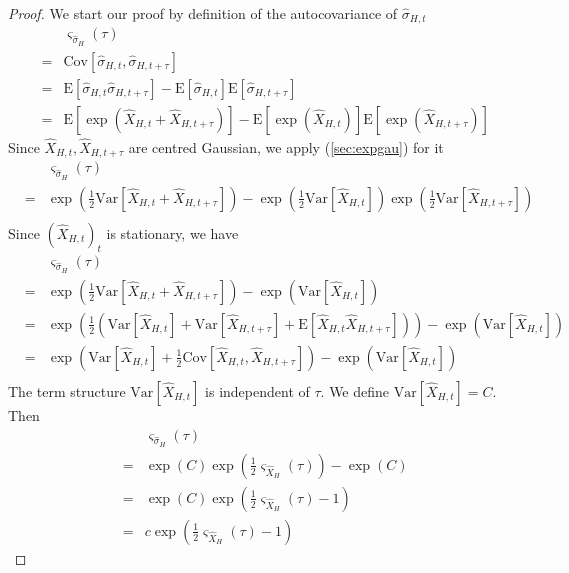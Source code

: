 \documentclass[a4paper, twoside, 11pt]{article}
\theoremstyle{definition}
\begin{document}
\begin{proof}
  We start our proof by definition of the autocovariance of $\hat{\sigma}_{H,t}$
  \begin{eqnarray*}
	&& \varsigma_{\hat{\sigma}_H}(\tau) \\
	&=& \mathrm{Cov}[\hat{\sigma}_{H,t}, \hat{\sigma}_{H, t+\tau}]\\
	&=& \mathrm{E}[\hat{\sigma}_{H,t} \hat{\sigma}_{H, t+\tau}] - \mathrm{E}[\hat{\sigma}_{H,t}]\mathrm{E}[\hat{\sigma}_{H,t+\tau}]\\
	&=& \mathrm{E}[\exp(\hat{X}_{H,t} + \hat{X}_{H, t+\tau})] - \mathrm{E}[\exp(\hat{X}_{H,t})]\mathrm{E}[\exp(\hat{X}_{H,t+\tau})] 
  \end{eqnarray*}
  Since $\hat{X}_{H,t}, \hat{X}_{H,t+\tau}$ are centred Gaussian, we apply (\ref{sec:expgau}) for it
  \begin{eqnarray*}
	&& \varsigma_{\hat{\sigma}_H}(\tau) \\
	&=& \exp(\frac{1}{2}\mathrm{Var}[\hat{X}_{H,t} + \hat{X}_{H, t+\tau}]) - \exp(\frac{1}{2}\mathrm{Var}[\hat{X}_{H,t}])  \exp(\frac{1}{2}\mathrm{Var}[\hat{X}_{H,t+\tau}])\\
  \end{eqnarray*}
  Since $(\hat{X}_{H,t})_t$ is stationary, we have
  \begin{eqnarray*}
	&& \varsigma_{\hat{\sigma}_H}(\tau) \\
	&=&  \exp(\frac{1}{2}\mathrm{Var}[\hat{X}_{H,t} + \hat{X}_{H, t+\tau}]) - \exp(\mathrm{Var}[\hat{X}_{H,t}])\\
	&=& \exp(\frac{1}{2}(\mathrm{Var}[\hat{X}_{H,t}] + \mathrm{Var}[\hat{X}_{H,t+\tau}] + \mathrm{E}[\hat{X}_{H,t}\hat{X}_{H,t+\tau}])) - \exp(\mathrm{Var}[\hat{X}_{H,t}])\\
	&=& \exp(\mathrm{Var}[\hat{X}_{H,t}] + \frac{1}{2}\mathrm{Cov}[\hat{X}_{H,t}, \hat{X}_{H,t+\tau}]) - \exp(\mathrm{Var}[\hat{X}_{H,t}])\\
  \end{eqnarray*}
  The term structure $\mathrm{Var}[\hat{X}_{H,t}]$ is independent of $\tau$. We define $\mathrm{Var}[\hat{X}_{H,t}] = C$. Then
\begin{eqnarray*}
	&& \varsigma_{\hat{\sigma}_H}(\tau) \\
	&=& \exp(C) \exp(\frac{1}{2}\varsigma_{\hat{X}_{H}}(\tau)) - \exp(C)\\
	&=& \exp(C)\exp(\frac{1}{2}\varsigma_{\hat{X}_{H}}(\tau) - 1)\\
	&=& c\exp(\frac{1}{2}\varsigma_{\hat{X}_{H}}(\tau) - 1)
 \end{eqnarray*}

\end{proof}
\end{document}
